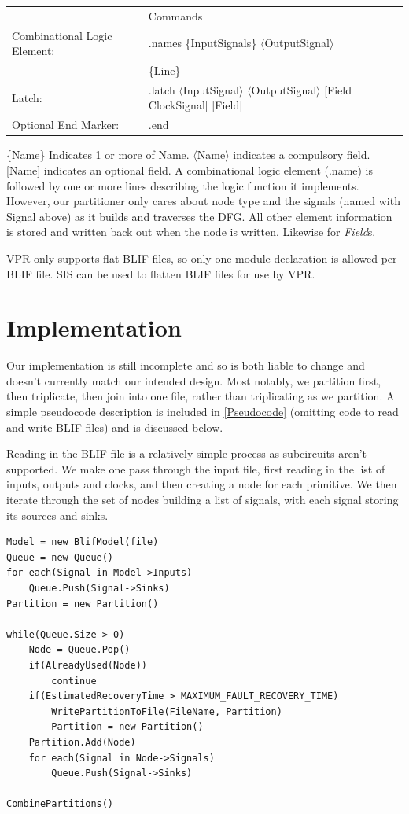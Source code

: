 \documentclass[12pt,drafta4paper,oneside]{memoir} %
\begin{document}
\begin{tabular}{lll}
    &Commands&\\
    Combinational Logic Element: & .names \{InputSignals\} $\langle$OutputSignal$\rangle$\\
     &\{Line\}&\\
    Latch: & .latch $\langle$InputSignal$\rangle$ $\langle$OutputSignal$\rangle$ [Field ClockSignal] [Field]&\\
    Optional End Marker: & .end
\end{tabular}
\{Name\} Indicates 1 or more of Name. $\langle$Name$\rangle$ indicates a compulsory field. [Name] indicates an optional field.
A combinational logic element (.name) is followed by one or more lines describing the logic function it implements. However, our partitioner only cares about node type and the signals (named with Signal above) as it builds and traverses the \ac{DFG}. All other element information is stored and written back out when the node is written. Likewise for \emph{Field}s.

\ac{VPR} only supports flat \ac{BLIF} files, so only one module declaration is allowed per \ac{BLIF} file. \ac{SIS} can be used to flatten \ac{BLIF} files for use by \ac{VPR}.

\section{Implementation}
Our implementation is still incomplete and so is both liable to change and doesn't currently match our intended design. Most notably, we partition first, then triplicate, then join into one file, rather than triplicating as we partition. A simple pseudocode description is included in \ref{Pseudocode} (omitting code to read and write \ac{BLIF} files) and is discussed below.

Reading in the \ac{BLIF} file is a relatively simple process as subcircuits aren't supported. We make one pass through the input file, first reading in the list of inputs, outputs and clocks, and then creating a node for each primitive. We then iterate through the set of nodes building a list of signals, with each signal storing its sources and sinks.

\begin{lstlisting}[caption=Simplified Pseudocode,label=Pseudocode]
Model = new BlifModel(file)
Queue = new Queue()
for each(Signal in Model->Inputs)
    Queue.Push(Signal->Sinks)
Partition = new Partition()

while(Queue.Size > 0)
    Node = Queue.Pop()
    if(AlreadyUsed(Node))
        continue
    if(EstimatedRecoveryTime > MAXIMUM_FAULT_RECOVERY_TIME)
        WritePartitionToFile(FileName, Partition)
        Partition = new Partition()
    Partition.Add(Node)
    for each(Signal in Node->Signals)
        Queue.Push(Signal->Sinks)

CombinePartitions()
\end{lstlisting}
\end{document}
